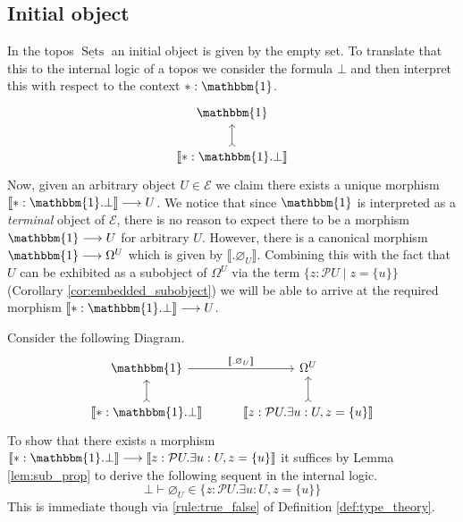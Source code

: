 \documentclass{tac}
\newcommand{\call}[1]{\mathcal{#1}}
\newcommand{\lto}{\longrightarrow}
\begin{document}
	\subsection{Initial object}\label{sec:initial_object}
	In the topos $\underline{\operatorname{Sets}}$ an initial object is given by the empty set. To translate that this to the internal logic of a topos we consider the formula $\bot$ and then interpret this with respect to the context $\ast: \mathbbm{1}$.
	\begin{equation}
		\begin{tikzcd}
			\mathbbm{1}\\
			\llbracket \ast: \mathbbm{1} . \bot \rrbracket\arrow[u,rightarrowtail]
		\end{tikzcd}
	\end{equation}
	Now, given an arbitrary object $U \in \call{E}$ we claim there exists a unique morphism $\llbracket \ast: \mathbbm{1} . \bot \rrbracket \lto U$. We notice that since $\mathbbm{1}$ is interpreted as a \emph{terminal} object of $\call{E}$, there is no reason to expect there to be a morphism $\mathbbm{1} \lto U$ for arbitrary $U$. However, there is a canonical morphism $\mathbbm{1} \lto \Omega^U$ which is given by $\llbracket . \varnothing_U\rrbracket$. Combining this with the fact that $U$ can be exhibited as a subobject of $\Omega^U$ via the term $\big\lbrace z : \call{P}U \mid z = \lbrace u \rbrace \big\rbrace$ (Corollary \ref{cor:embedded_subobject}) we will be able to arrive at the required morphism $\llbracket \ast: \mathbbm{1} . \bot \rrbracket \lto U$.
	
	Consider the following Diagram.
	\begin{equation}\label{eq:initial_pullback}
		\begin{tikzcd}
			\mathbbm{1}\arrow[r,"{\llbracket . \varnothing_U \rrbracket}"] & \Omega^U\\
			\llbracket \ast: \mathbbm{1} . \bot \rrbracket\arrow[u,rightarrowtail] & \llbracket z: \call{P}U . \exists u:U, z = \lbrace u \rbrace \rrbracket\arrow[u,rightarrowtail]
		\end{tikzcd}
	\end{equation}
	To show that there exists a morphism $\llbracket \ast: \mathbbm{1} . \bot \rrbracket \lto \llbracket z: \call{P}U . \exists u:U, z = \lbrace u \rbrace \rrbracket$ it suffices by Lemma \ref{lem:sub_prop} to derive the following sequent in the internal logic.
	\begin{equation}\label{eq:entailment}
		\bot \vdash \varnothing_U \in \lbrace z: \call{P}U . \exists u:U, z = \lbrace u \rbrace \rbrace
	\end{equation}
	This is immediate though via \ref{rule:true_false} of Definition \ref{def:type_theory}.
	
\end{document}
